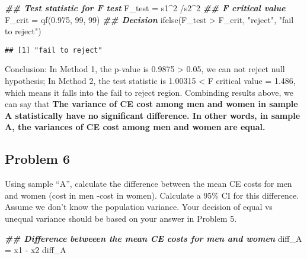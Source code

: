 \documentclass[
]{article}
\newenvironment{Shaded}{\begin{snugshade}}{\end{snugshade}}
\newcommand{\DecValTok}[1]{\textcolor[rgb]{0.00,0.00,0.81}{#1}}
\newcommand{\DocumentationTok}[1]{\textcolor[rgb]{0.56,0.35,0.01}{\textbf{\textit{#1}}}}
\newcommand{\FloatTok}[1]{\textcolor[rgb]{0.00,0.00,0.81}{#1}}
\newcommand{\FunctionTok}[1]{\textcolor[rgb]{0.00,0.00,0.00}{#1}}
\newcommand{\NormalTok}[1]{#1}
\newcommand{\OtherTok}[1]{\textcolor[rgb]{0.56,0.35,0.01}{#1}}
\newcommand{\SpecialCharTok}[1]{\textcolor[rgb]{0.00,0.00,0.00}{#1}}
\newcommand{\StringTok}[1]{\textcolor[rgb]{0.31,0.60,0.02}{#1}}
\begin{document}
\begin{Shaded}
\begin{Highlighting}[]
\DocumentationTok{\#\# Test statistic for F test}
\NormalTok{F\_test }\OtherTok{=}\NormalTok{ s1}\SpecialCharTok{\^{}}\DecValTok{2} \SpecialCharTok{/}\NormalTok{s2}\SpecialCharTok{\^{}}\DecValTok{2}
\DocumentationTok{\#\# F critical value}
\NormalTok{F\_crit }\OtherTok{=} \FunctionTok{qf}\NormalTok{(}\FloatTok{0.975}\NormalTok{, }\DecValTok{99}\NormalTok{, }\DecValTok{99}\NormalTok{)}
\DocumentationTok{\#\# Decision}
\FunctionTok{ifelse}\NormalTok{(F\_test }\SpecialCharTok{\textgreater{}}\NormalTok{ F\_crit, }\StringTok{"reject"}\NormalTok{, }\StringTok{"fail to reject"}\NormalTok{)}
\end{Highlighting}
\end{Shaded}

\begin{verbatim}
## [1] "fail to reject"
\end{verbatim}

Conclusion: In Method 1, the p-value is 0.9875 \textgreater{} 0.05, we
can not reject null hypothesis; In Method 2, the test statistic is
1.00315 \textless{} F critical value = 1.486, which means it falls into
the fail to reject region. Combinding results above, we can say that
\textbf{The variance of CE cost among men and women in sample A
statistically have no significant difference. In other words, in sample
A, the variances of CE cost among men and women are equal.}

\hypertarget{problem-6}{%
\subsection{Problem 6}\label{problem-6}}

Using sample ``A'', calculate the difference between the mean CE costs
for men and women (cost in men -cost in women). Calculate a 95\% CI for
this difference. Assume we don't know the population variance. Your
decision of equal vs unequal variance should be based on your answer in
Problem 5.

\begin{Shaded}
\begin{Highlighting}[]
\DocumentationTok{\#\# Difference betweeen the mean CE costs for men and women}
\NormalTok{diff\_A }\OtherTok{=}\NormalTok{ x1 }\SpecialCharTok{{-}}\NormalTok{ x2}
\NormalTok{diff\_A}
\end{Highlighting}
\end{Shaded}
\end{document}
